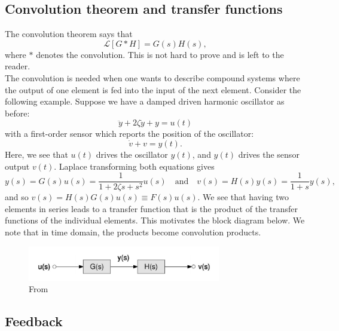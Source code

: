 \documentclass{book}
\theoremstyle{definition}
\newcommand{\lag}{\mathcal{L}}
\newcommand{\f}[2]{\frac{#1}{#2}}
\begin{document}
\subsection{Convolution theorem and transfer functions}


The convolution theorem says that
\begin{equation*}
\lag[G\ast H] = G(s)H(s),
\end{equation*} 
where $\ast$ denotes the convolution. This is not hard to prove and is left to the reader. \\


The convolution is needed when one wants to describe compound systems where the output of one element is fed into the input of the next element. Consider the following example. Suppose we have a damped driven harmonic oscillator as before: 
\begin{equation*}
\ddot{y} + 2\zeta \dot{y} + y = u(t)
\end{equation*}
with a first-order sensor which reports the position of the oscillator:
\begin{equation*}
\dot{v} + v = y(t). 
\end{equation*}
Here, we see that $u(t)$ drives the oscillator $y(t)$, and $y(t)$ drives the sensor output $v(t)$. Laplace transforming both equations gives
\begin{equation*}
y(s) = G(s)u(s) = \f{1}{1 + 2\zeta s + s^2}u(s) \quad \text{and} \quad v(s) = H(s)y(s) = \f{1}{1+s} y(s),
\end{equation*}
and so $v(s) = H(s) G(s) u(s) \equiv F(s) u(s)$. We see that having two elements in series leads to a transfer function that is the product
of the transfer functions of the individual elements. This motivates the block diagram below. We note that in time domain, the products become convolution products. 


\begin{figure}[!htb]
	\centering
	\includegraphics[width=0.75\textwidth]{images/block-1}
	\caption{From \cite{bechhoefer2005feedback}}
\end{figure}


\subsection*{Feedback}
\end{document}
